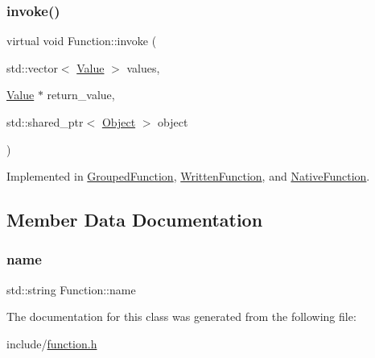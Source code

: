 \mbox{\label{classFunction_a84f9a63e68becc27e58ea738ba4cd698}} 
\subsubsection{\texorpdfstring{invoke()}{invoke()}}
{\footnotesize\ttfamily virtual void Function\+::invoke (\begin{DoxyParamCaption}\item[{std\+::vector$<$ \hyperlink{classValue}{Value} $>$}]{values,  }\item[{\hyperlink{classValue}{Value} $\ast$}]{return\+\_\+value,  }\item[{std\+::shared\+\_\+ptr$<$ \hyperlink{classObject}{Object} $>$}]{object }\end{DoxyParamCaption})\hspace{0.3cm}{\ttfamily [pure virtual]}}



Implemented in \hyperlink{classGroupedFunction_a90a74bd39250863046a7cb97ce013d2b}{Grouped\+Function}, \hyperlink{classWrittenFunction_afe56e5eb6a13f6e38ab5ec87e371d745}{Written\+Function}, and \hyperlink{classNativeFunction_a0f003d805cbc3625e311d1b2a1b861d9}{Native\+Function}.



\subsection{Member Data Documentation}
\mbox{\label{classFunction_a161d1ceb4f67f3222caf429fea7b71f1}} 
\subsubsection{\texorpdfstring{name}{name}}
{\footnotesize\ttfamily std\+::string Function\+::name}



The documentation for this class was generated from the following file\+:\begin{DoxyCompactItemize}
\item 
include/\hyperlink{function_8h}{function.\+h}\end{DoxyCompactItemize}
